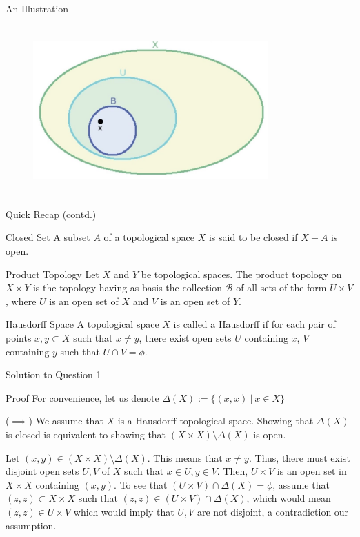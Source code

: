 \documentclass{beamer}
\begin{document}
\begin{frame}{An Illustration}
\begin{figure}
    \centering
    \includegraphics[width=9cm, height=6.5cm]{basis.jpeg}
\end{figure}
    
\end{frame}

\begin{frame}{Quick Recap (contd.)}
    \begin{block}{Closed Set}
    A subset $A$ of a topological space $X$ is said to be closed if $X-A$ is open. 
    \end{block}
    \begin{block}{Product Topology}
    Let $X$ and $Y$ be topological spaces. The product topology on $X \times Y$ is the topology having as basis the collection $\mathscr{B}$ of all sets of the form $U \times V$, where $U$ is an open set of $X$ and $V$ is an open set of $Y$.
    \end{block}
    \begin{block}{Hausdorff Space}
    A topological space $X$ is called a Hausdorff if for each pair of points $x, y \subset X$ such that $x \neq y$, there exist open sets $U$ containing $x$, $V$ containing $y$ such that $U \cap V = \phi$.
    
    \end{block}
\end{frame}

\begin{frame}{Solution to Question 1}
    \begin{block}{Proof}
    For convenience, let us denote $\Delta(X) := \{(x,x) \ | \ x \in X\}$
    
    ($\implies$) We assume that $X$ is a Hausdorff topological space. Showing that $\Delta(X)$ is closed is equivalent to showing that $(X\times X) \setminus \Delta(X)$ is open. 
    
    Let $(x,y) \in (X\times X) \setminus \Delta(X)$. This means that $x \neq y$. Thus, there must exist disjoint open sets $U, V$ of $X$ such that $x \in U, y \in V$. Then, $U \times V$ is an open set in $X \times X$ containing $(x,y)$. To see that $(U \times V) \cap \Delta(X) = \phi$, assume that $(z,z) \subset X\times X$ such that $(z,z) \in (U \times V) \cap \Delta(X)$, which would mean $(z,z) \in U \times V$ which would imply that $U, V$ are not disjoint, a contradiction our assumption.
    \end{block}
    
\end{frame}
\end{document}
